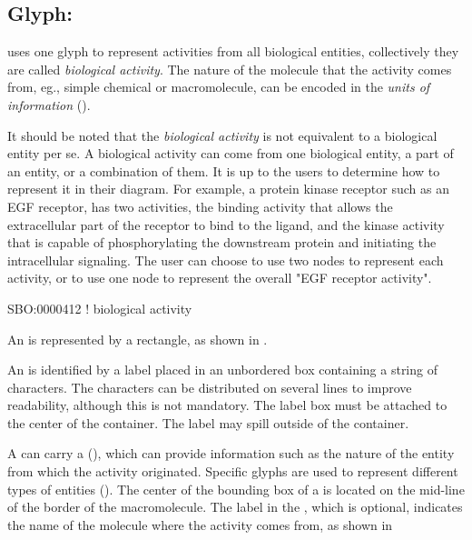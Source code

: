 \subsection{Glyph: }
\label{sec:af:biologicalActivity}

\SBGNAFLone uses one glyph to represent activities from all biological entities, collectively they are called \emph{biological activity}. The nature of the molecule that the activity comes from, eg., simple chemical or macromolecule, can be encoded in the \emph{units of information} ().

It should be noted that the \emph{biological activity} is not equivalent to a biological entity per se.  A biological activity can come from one biological entity, a part of an entity, or a combination of  them.  It is up to the users to determine how to represent it in their diagram.  For example, a protein kinase receptor such as an EGF receptor, has two activities, the binding activity that allows the extracellular part of the receptor to bind to the ligand, and the kinase activity that is capable of phosphorylating the downstream protein and initiating the intracellular signaling.  The user can choose to use two nodes to represent each activity, or to use one node to represent the overall "EGF receptor activity".

\begin{glyphDescription}

\glyphSboTerm SBO:0000412 ! biological activity

\glyphContainer An  is represented by a rectangle, as shown in .

\glyphLabel An  is identified by a label placed in an unbordered box containing a string of characters.  The characters can be distributed on several lines to improve readability, although this is not mandatory.  The label box must be attached to the center of the container.  The label may spill outside of the container.

\glyphAux A  can carry a  (), which can provide information such as the nature of the entity from which the activity originated.  Specific glyphs are used to represent different types of entities ().  The center of the bounding box of a  is located on the mid-line of the border of the macromolecule.  The label in the , which is optional, indicates the name of the molecule where the activity comes from, as shown in 

\end{glyphDescription}

